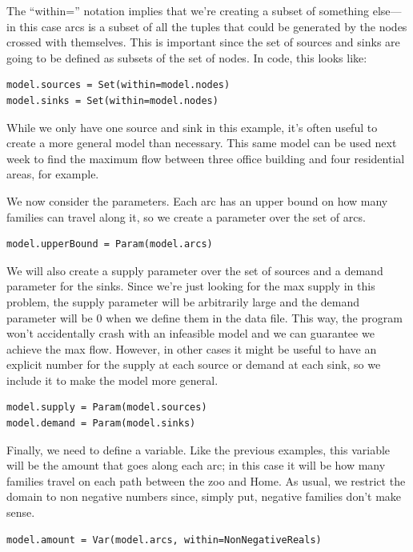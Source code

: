 \documentclass{article}
\begin{document}
The ``within='' notation implies that we're creating a subset of something else---in this case arcs is a subset of all the tuples that could be generated by the nodes crossed with themselves.  This is important since the set of sources and sinks are going to be defined as subsets of the set of nodes.  In code, this looks like:

\begin{verbatim}
model.sources = Set(within=model.nodes)
model.sinks = Set(within=model.nodes)
\end{verbatim}

\noindent
While we only have one source and sink in this example, it's often useful to create a more general model than necessary.  This same model can be used next week to find the maximum flow between three office building and four residential areas, for example.

We now consider the parameters.  Each arc has an upper bound on how many families can travel along it, so we create a parameter over the set of arcs.

\begin{verbatim}
model.upperBound = Param(model.arcs)
\end{verbatim}

We will also create a supply parameter over the set of sources and a demand parameter for the sinks.  Since we're just looking for the max supply in this problem, the supply parameter will be arbitrarily large and the demand parameter will be $0$ when we define them in the data file.  This way, the program won't accidentally crash with an infeasible model and we can guarantee we achieve the max flow.  However, in other cases it might be useful to have an explicit number for the supply at each source or demand at each sink, so we include it to make the model more general.

\begin{verbatim}
model.supply = Param(model.sources)
model.demand = Param(model.sinks)
\end{verbatim}

Finally, we need to define a variable.  Like the previous examples, this variable will be the amount that goes along each arc; in this case it will be how many families travel on each path between the zoo and Home.  As usual, we restrict the domain to non negative numbers since, simply put, negative families don't make sense.  

\begin{verbatim}
model.amount = Var(model.arcs, within=NonNegativeReals)
\end{verbatim}
\end{document}
